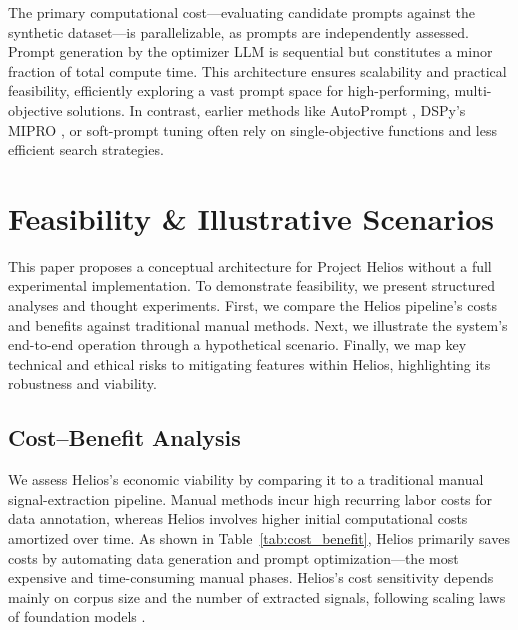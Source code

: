 \documentclass{article}
\begin{document}
The primary computational cost—evaluating candidate prompts against the synthetic dataset—is parallelizable, as prompts are independently assessed. Prompt generation by the optimizer LLM is sequential but constitutes a minor fraction of total compute time. This architecture ensures scalability and practical feasibility, efficiently exploring a vast prompt space for high-performing, multi-objective solutions. In contrast, earlier methods like AutoPrompt \citep{shin2020autopromptelicitingknowledgelanguage}, DSPy's MIPRO \citep{opsahlong2024optimizinginstructionsdemonstrationsmultistage}, or soft-prompt tuning \citep{lester2021powerscaleparameterefficientprompt} often rely on single-objective functions and less efficient search strategies.

\section{Feasibility \& Illustrative Scenarios}
\label{sec:feasibility}
This paper proposes a conceptual architecture for Project Helios without a full experimental implementation. To demonstrate feasibility, we present structured analyses and thought experiments. First, we compare the Helios pipeline's costs and benefits against traditional manual methods. Next, we illustrate the system's end-to-end operation through a hypothetical scenario. Finally, we map key technical and ethical risks to mitigating features within Helios, highlighting its robustness and viability.

\subsection{Cost--Benefit Analysis}
\label{subsec:cost_benefit}
We assess Helios's economic viability by comparing it to a traditional manual signal-extraction pipeline. Manual methods incur high recurring labor costs for data annotation, whereas Helios involves higher initial computational costs amortized over time. As shown in Table~\ref{tab:cost_benefit}, Helios primarily saves costs by automating data generation and prompt optimization—the most expensive and time-consuming manual phases. Helios's cost sensitivity depends mainly on corpus size and the number of extracted signals, following scaling laws of foundation models \citep{kaplan2020scalinglawsneurallanguage}.
\end{document}
